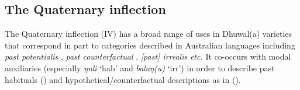 %
%
%


\subsection{The Quaternary inflection}\label{desc-iv}


The Quaternary inflection (\gls{IV}) has a broad range of uses in Dhuwal(a) varieties that correspond in part to categories described in Australian languages including \textit{past potentialis} \citep{Heath1980a}, \textit{past counterfactual} \cite{McKay2011}, \textit{[past] irrealis} \citep[159]{Austin1998} \textit{etc.} It co-occurs with modal auxiliaries (especially \textit{ŋuli} `\gls{hab}' and \textit{balaŋ(u)} `\gls{irr}') in order to describe past habituals () and hypothetical/counterfactual descriptions as in ().


